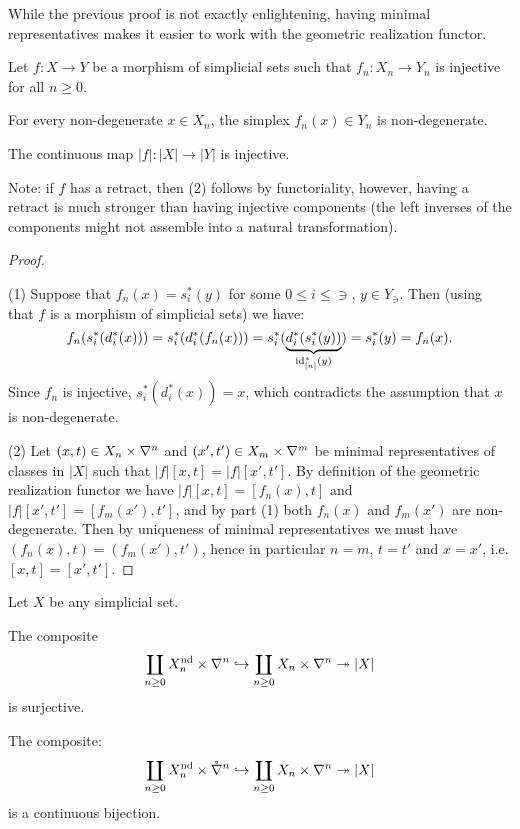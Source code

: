 While the previous proof is not exactly enlightening, having minimal representatives makes it easier to work with the geometric realization functor.

\begin{corollary}\label{corollary:criterion-for-injectivity-of-map-between-realizations}
Let $f:X\to Y$ be a morphism of simplicial sets such that $f_n:X_n\to Y_n$ is injective for all $n\ge0$.
\begin{numerate}
\item For every non-degenerate $x\in X_n$, the simplex $f_n(x)\in Y_n$ is non-degenerate.
\item The continuous map $|f|:|X|\to|Y|$ is injective.
\end{numerate}
\end{corollary}

Note: if $f$ has a retract, then (2) follows by functoriality, however, having a retract is much stronger than having injective components (the left inverses of the components might not assemble into a natural transformation).

\begin{proof}\ 

(1) Suppose that $f_n(x)=s_i^*(y)$ for some $0\le i\le\ni$, $y\in Y_\ni$. Then (using that $f$ is a morphism of simplicial sets) we have:
\[f_n(s_i^*(d_i^*(x)))=s_i^*(d_i^*(f_n(x)))=s_i^*(\underbrace{d_i^*(s_i^*(y))}_{\operatorname{id}_{[n]}^*(y)})=s_i^*(y)=f_n(x).\]
Since $f_n$ is injective, $s_i^*(d_i^*(x))=x$, which contradicts the assumption that $x$ is non-degenerate.

(2) Let $(x,t)\in X_n\times\nabla^n$ and $(x',t')\in X_m\times\nabla^{m}$ be minimal representatives of classes in $|X|$ such that $|f|[x,t]=|f|[x',t']$. By definition of the geometric realization functor we have $|f|[x,t]=[f_n(x),t]$ and $|f|[x',t']=[f_m(x'),t']$, and by part (1) both $f_n(x)$ and $f_m(x')$ are non-degenerate.
Then by uniqueness of minimal representatives we must have $(f_n(x),t)=(f_m(x'),t')$, hence in particular $n=m$, $t=t'$ and $x=x'$, i.e. $[x,t]=[x',t']$.
\end{proof}

\begin{corollary}\label{corollary:compostition-of-realization}
Let $X$ be any simplicial set.
\begin{numerate}
\item The composite
\[\coprod_{n\ge0} X_n^\text{nd}\times\nabla^n\hookrightarrow\coprod_{n\ge0} X_n\times\nabla^n\twoheadrightarrow|X|\]
is surjective.
\item The composite:
\[\coprod_{n\ge0} X_n^\text{nd}\times\mathring\nabla^n\hookrightarrow\coprod_{n\ge0} X_n\times\nabla^n\twoheadrightarrow|X|\]
is a continuous bijection.
\end{numerate}
\end{corollary}

